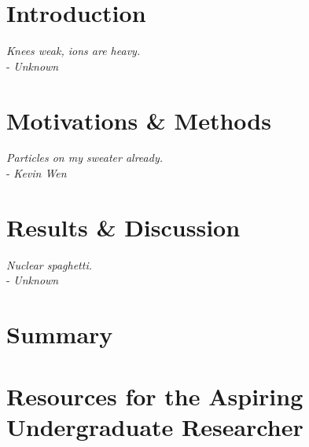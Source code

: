 \documentclass[letterpaper, 12pt]{report}
\begin{document}
\commcertpage
\newpage
\titlepage




\tableofcontents

\chapter{Introduction}
\begin{flushright}
    \textit{Knees weak, ions are heavy.} \\
    - \textit{Unknown}
\end{flushright}


\chapter{Motivations \& Methods}
\begin{flushright}
    \textit{Particles on my sweater already.} \\ 
    - \textit{Kevin Wen}
\end{flushright}


\chapter{Results \& Discussion}
\begin{flushright}
    \textit{Nuclear spaghetti.} \\
    - \textit{Unknown}
\end{flushright}


\chapter{Summary}


\chapter{Resources for the Aspiring Undergraduate Researcher}


\begin{appendices}
    
\end{appendices}


\printbibliography[ heading=bibintoc, title={Works Cited}] 
\end{document}
